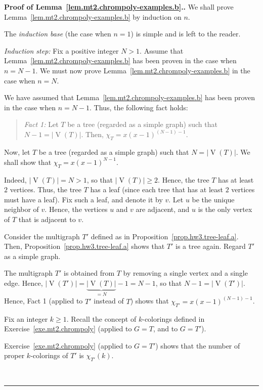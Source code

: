 \documentclass[numbers=enddot,12pt,final,onecolumn,notitlepage]{scrartcl}%
\theoremstyle{definition}
\newenvironment{statement}{\begin{quote}}{\end{quote}}
\newenvironment{proof}[1][Proof]{\noindent\textbf{#1.} }{\ \rule{0.5em}{0.5em}}
\newcommand{\abs}[1]{\left| #1 \right|}
\newcommand{\tup}[1]{\left( #1 \right)}
\newcommand{\verts}[1]{\operatorname{V}\left( #1 \right)}
\begin{document}
\begin{proof}[Proof of Lemma~\ref{lem.mt2.chrompoly-examples.b}.]
We shall prove Lemma~\ref{lem.mt2.chrompoly-examples.b} by
induction on $n$.

The \textit{induction base} (the case when $n = 1$) is
simple and is left to the reader.

\textit{Induction step:}
Fix a positive integer $N > 1$.
Assume that Lemma~\ref{lem.mt2.chrompoly-examples.b} has been
proven in the case when $n = N - 1$.
We must now prove Lemma~\ref{lem.mt2.chrompoly-examples.b} in
the case when $n = N$.

We have assumed that Lemma~\ref{lem.mt2.chrompoly-examples.b} has
been proven in the case when $n = N - 1$.
Thus, the following fact holds:
\begin{statement}
  \textit{Fact 1:}
  Let $T$ be a tree (regarded as a simple graph)
  such that $N - 1 = \abs{\verts{T}}$.
  Then, $\chi_T = x \tup{x-1}^{\tup{N-1}-1}$.
\end{statement}

Now, let $T$ be a tree (regarded as a simple graph)
such that $N = \abs{\verts{T}}$.
We shall show that $\chi_T = x \tup{x-1}^{N-1}$.

Indeed, $\abs{\verts{T}} = N > 1$, so that
$\abs{\verts{T}} \geq 2$.
Hence, the tree $T$ has at least $2$ vertices.
Thus, the tree $T$ has a leaf (since each tree that
has at least $2$ vertices must have a leaf).
Fix such a leaf, and denote it by $v$.
Let $u$ be the unique neighbor of $v$.
Hence, the vertices $u$ and $v$ are adjacent, and
$u$ is the only vertex of $T$ that is adjacent to $v$.

Consider the multigraph $T'$ defined as in
Proposition~\ref{prop.hw3.tree-leaf.a}.
Then, Proposition~\ref{prop.hw3.tree-leaf.a} shows
that $T'$ is a tree again.
Regard $T'$ as a simple graph.

The multigraph $T'$ is obtained from $T$ by removing
a single vertex and a single edge.
Hence,
$\abs{\verts{T'}} = \underbrace{\abs{\verts{T}}}_{= N} - 1
= N-1$,
so that $N - 1 = \abs{\verts{T'}}$.
Hence, Fact 1 (applied to $T'$ instead of $T$) shows that
$\chi_{T'} = x \tup{x-1}^{\tup{N-1}-1}$.

Fix an integer $k \geq 1$.
Recall the concept of $k$-colorings defined in
Exercise~\ref{exe.mt2.chrompoly} (applied to $G = T$, and
to $G = T'$).

Exercise~\ref{exe.mt2.chrompoly} (applied to $G = T'$)
shows that the number of proper $k$-colorings of $T'$ is
$\chi_{T'} \tup{k}$.


\end{proof}
\end{document}
